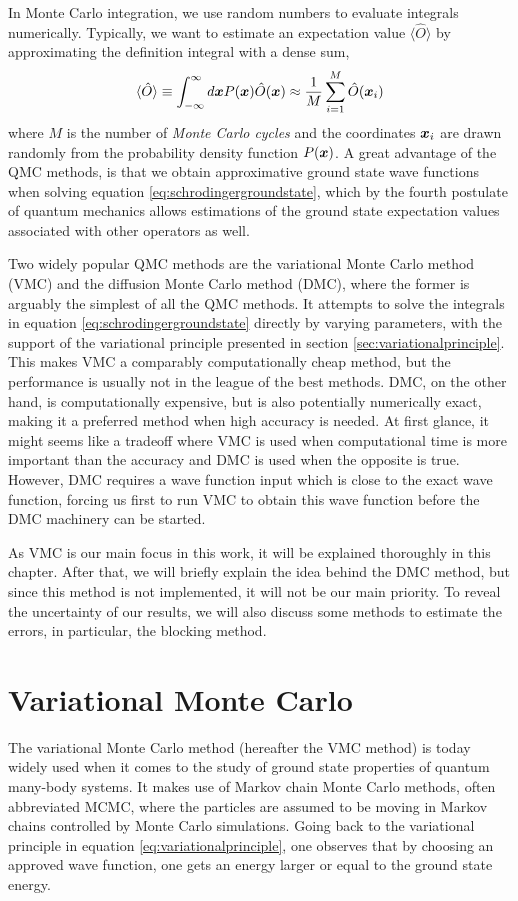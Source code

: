 In Monte Carlo integration, we use random numbers to evaluate integrals numerically. Typically, we want to estimate an expectation value $\langle\hat{O}\rangle$ by approximating the definition integral with a dense sum,
\begin{equation}
\langle \hat{O}\rangle\equiv\int_{-\infty}^{\infty}d\boldsymbol{{x}}P(\boldsymbol{{x}})\hat{O}(\boldsymbol{{x}})\approx\frac{1}{M}\sum_{i=1}^M\hat{O}(\boldsymbol{{x}}_i)
\label{eq:montecarlointegration}
\end{equation}
where $M$ is the number of \textit{Monte Carlo cycles} and the coordinates $\boldsymbol{{x}}_i$ are drawn randomly from the probability density function $P(\boldsymbol{{x}})$. A great advantage of the QMC methods, is that we obtain approximative ground state wave functions when solving equation \eqref{eq:schrodingergroundstate}, which by the fourth postulate of quantum mechanics allows estimations of the ground state expectation values associated with other operators as well. 

Two widely popular QMC methods are the variational Monte Carlo method (VMC) and the diffusion Monte Carlo method (DMC), where the former is arguably the simplest of all the QMC methods. It attempts to solve the integrals in equation \eqref{eq:schrodingergroundstate} directly by varying parameters, with the support of the variational principle presented in section \ref{sec:variationalprinciple}. This makes VMC a comparably computationally cheap method, but the performance is usually not in the league of the best methods. DMC, on the other hand, is computationally expensive, but is also potentially numerically exact, making it a preferred method when high accuracy is needed. At first glance, it might seems like a tradeoff where VMC is used when computational time is more important than the accuracy and DMC is used when the opposite is true. However, DMC requires a wave function input which is close to the exact wave function, forcing us first to run VMC to obtain this wave function before the DMC machinery can be started.

As VMC is our main focus in this work, it will be explained thoroughly in this chapter. After that, we will briefly explain the idea behind the DMC method, but since this method is not implemented, it will not be our main priority. To reveal the uncertainty of our results, we will also discuss some methods to estimate the errors, in particular, the blocking method.

\section{Variational Monte Carlo} \label{sec:vmc}
The variational Monte Carlo method (hereafter the VMC method) is today widely used when it comes to the study of ground state properties of quantum many-body systems. It makes use of Markov chain Monte Carlo methods, often abbreviated MCMC, where the particles are assumed to be moving in Markov chains controlled by Monte Carlo simulations. Going back to the variational principle in equation \eqref{eq:variationalprinciple}, one observes that by choosing an approved wave function, one gets an energy larger or equal to the ground state energy.

